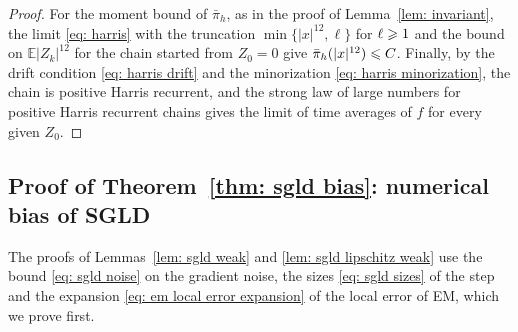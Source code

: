 \begin{proof}
    For the moment bound of $\bar\pi_h$, as in the proof of Lemma~\ref{lem: invariant}, the limit \eqref{eq: harris} with the truncation $\min\{ |x|^{12}, \ell \}$ for $\ell \geqslant 1$ and the bound on $\mathbb E |Z_k|^{12}$ for the chain started from $Z_0 = 0$ give $\bar\pi_h(|x|^{12}) \leqslant C$. Finally, by the drift condition \eqref{eq: harris drift} and the minorization \eqref{eq: harris minorization}, the chain is positive Harris recurrent, and the strong law of large numbers for positive Harris recurrent chains \citep[Theorem~17.0.1(i)]{meyn1993markov} gives the limit of time averages of $f$ for every given $Z_0$.
\end{proof}

\subsection{Proof of Theorem~\ref{thm: sgld bias}: numerical bias of SGLD}
\label{sec: sgld bias proof}

The proofs of Lemmas~\ref{lem: sgld weak} and \ref{lem: sgld lipschitz weak} use the bound \eqref{eq: sgld noise} on the gradient noise, the sizes \eqref{eq: sgld sizes} of the step and the expansion \eqref{eq: em local error expansion} of the local error of EM, which we prove first.

